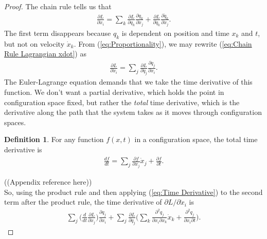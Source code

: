 \documentclass[10pt, psamsfonts]{amsart}
\theoremstyle{definition}
\newtheorem{defn}[thm]{Definition}
\theoremstyle{remark}
\numberwithin{equation}{section}
\begin{document}
\begin{proof}
The chain rule tells us that
\begin{align}
  \label{eq:Chain Rule Lagrangian xdot} 
  \frac{\partial L}{\partial \dot{x}_i}  = \sum_k \frac{\partial L}{\partial q_k} \frac{\partial q_k}{\partial \dot{x}_j} + \frac{\partial L}{\partial \dot{q}_k} \frac{\partial \dot{q}_k}{\partial \dot{x}_j}.
\end{align}
The first term disappears because $q_k$ is dependent on position and time $x_k$ and $t$, but not on velocity $\dot{x}_k$. From (\ref{eq:Proportionality}), we may rewrite (\ref{eq:Chain Rule Lagrangian xdot}) as
\begin{align*}
  \frac{\partial L}{\partial \dot{x}_i} = \sum_j \frac{\partial L}{\partial \dot{q}_j} \frac{\partial q_j}{\partial x_i}. 
\end{align*}
The Euler-Lagrange equation demands that we take the time derivative of this function. We don't want a partial derivative, which holds the point in configuration space fixed, but rather the \textit{total} time derivative, which is the derivative along the path that the system takes as it moves through configuration spaces.

\begin{defn}
For any function $f(x,t)$ in a configuration space, the total time derivative is
\begin{align}
  \label{eq:Time Derivative}
  \frac{df}{dt} = \sum_j \frac{\partial f}{\partial x_j} \dot{x}_j + \frac{\partial f}{\partial t}. 
\end{align}
\end{defn}
((Appendix reference here))\\
\noindent So, using the product rule and then applying (\ref{eq:Time Derivative}) to the second term after the product rule, the time derivative of $\partial L/\partial \dot{x}_i$ is
\begin{align}
  \label{eq:Time Derivative Lagrangian}
  \sum_j \bigg(\frac{d}{dt} \frac{\partial L}{\partial \dot{x}_j}  \bigg) \frac{\partial q_j}{\partial x_i} + \sum_j \frac{\partial L}{\partial \dot{q}_j} \bigg(\sum_{k} \frac{\partial^2 q_j}{\partial x_i \partial x_k} \dot{x}_k + \frac{\partial^2 q_j}{\partial x_i \partial t}  \bigg).
\end{align}


\end{proof}
\end{document}

